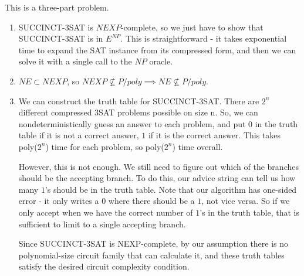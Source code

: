 \documentclass{article}
\newenvironment{problem}[2][Problem]{\begin{trivlist}
\item[\hskip \labelsep {\bfseries #1}\hskip \labelsep {\bfseries #2.}]}{\end{trivlist}}
\begin{document}
\begin{problem}{5}
  This is a three-part problem.
  \begin{enumerate}
    \item SUCCINCT-3SAT is $NEXP$-complete, so we just have to show
      that SUCCINCT-3SAT is in $E^{NP}$. This is straightforward - it
      takes exponential time to expand the SAT instance from its
      compressed form, and then we can solve it with a single call to
      the $NP$ oracle.
    \item $NE \subset NEXP$, so
      $NEXP \nsubseteq P/poly \implies NE \nsubseteq P/poly$.
    \item We can construct the truth table for SUCCINCT-3SAT. There
      are $2^n$ different compressed 3SAT problems possible on size
      n. So, we can nondeterministically guess an answer to each
      problem, and put $0$ in the truth table if it is not a
      correct answer, $1$ if it is the correct answer. This takes
      poly($2^n$) time for each problem, so poly($2^n$) time overall.

      However, this is not enough. We still need to figure out which
      of the branches should be the accepting branch. To do this, our
      advice string can tell us how many $1$'s should be in the truth
      table. Note that our algorithm has one-sided error - it only
      writes a $0$ where there should be a $1$, not vice versa. So if
      we only accept when we have the correct number of $1$'s in the
      truth table, that is sufficient to limit to a single accepting
      branch.

      Since SUCCINCT-3SAT is NEXP-complete, by our assumption there is
      no polynomial-size circuit family that can calculate it, and
      these truth tables satisfy the desired circuit complexity condition.
  \end{enumerate}
\end{problem}
\end{document}
